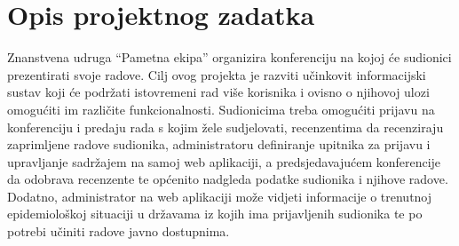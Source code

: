 \chapter{Opis projektnog zadatka}

		Znanstvena udruga “Pametna ekipa” organizira konferenciju na kojoj će sudionici prezentirati svoje radove. Cilj ovog projekta je razviti učinkovit informacijski sustav koji će podržati istovremeni rad više korisnika i ovisno o njihovoj ulozi omogućiti im različite funkcionalnosti. Sudionicima treba omogućiti prijavu na konferenciju i predaju rada s kojim žele sudjelovati, recenzentima da recenziraju zaprimljene radove sudionika, administratoru definiranje upitnika za prijavu i upravljanje sadržajem na samoj web aplikaciji, a predsjedavajućem konferencije da odobrava recenzente te općenito nadgleda podatke sudionika i njihove radove. Dodatno, administrator na web aplikaciji može vidjeti informacije o trenutnoj epidemiološkoj situaciji u državama iz kojih ima prijavljenih sudionika te po potrebi učiniti radove javno dostupnima.
		\newline
		\newline

